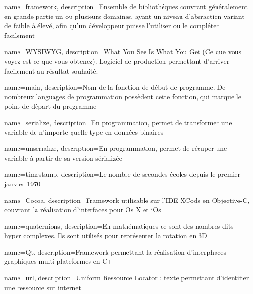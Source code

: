 {
  name=framework,
  description={Ensemble de bibliothéques couvrant généralement en grande partie un ou plusieurs domaines, ayant un niveau d'absraction variant de faible à élevé, afin qu'un développeur puisse l'utiliser ou le compléter facilement }
}

{
  name=WYSIWYG,
  description={What You See Is What You Get (Ce que vous voyez est ce que vous obtenez). Logiciel de production permettant d'arriver facilement au résultat souhaité.}
}

{
  name=main,
  description={Nom de la fonction de début de programme. De nombreux languages de programmation possèdent cette fonction, qui marque le point de départ du programme}
}

{
  name=serialize,
  description={En programmation, permet de transformer une variable de n'importe quelle type en données binaires}
}

{
  name=unserialize,
  description={En programmation, permet de récuper une variable à partir de sa version sérializée}
}

{
  name=timestamp,
  description={Le nombre de secondes écoles depuis le premier janvier 1970}
}

{
  name=Cocoa,
  description={Framework utilisable sur l'IDE XCode en Objective-C, couvrant la réalisation d'interfaces pour Os X et iOs}
}


{
  name=quaternions,
  description={En mathématiques ce sont des nombres dits hyper complexes. Ils sont utilisés pour représenter la rotation en 3D}
}

{
  name=Qt,
  description={Framework permettant la réalisation d'interphaces graphiques multi-plateformes en C++}
}

{
  name=url,
  description={Uniform Ressource Locator : texte permettant d'identifier une ressource sur internet}
}